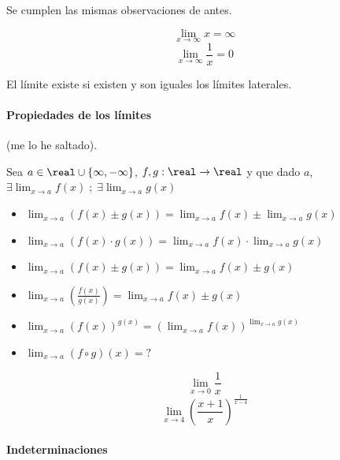 \documentclass[palatino,nosec]{Docencia}
\begin{document}
\obs Se cumplen las mismas observaciones de antes.

\begin{example}
	\[\lim_{x\to\infty}x=\infty\]
	\[\lim_{x\to\infty}\frac{1}{x}=0\]
\end{example}

\begin{defn} 
	El límite existe si existen y son iguales los límites laterales. 
\end{defn}


\paragraph{Propiedades de los límites} (me lo he saltado).

Sea $a\in\real\cup\{\infty,-\infty\}$, $f,g:\real\to\real$ y que dado $a$, $\exists\lim_{x\to a}f(x) \;;\; \exists\lim_{x\to a}g(x)$
\begin{itemize}
	\item $\lim_{x\to a} \left(f(x) \pm g(x)\right) = \lim_{x\to a} f(x) \pm \lim_{x\to a} g(x)$
	\item $\lim_{x\to a} \left(f(x) · g(x)\right) = \lim_{x\to a} f(x) · \lim_{x\to a} g(x)$
	\item $\lim_{x\to a} \left(f(x) \pm g(x)\right) = \lim_{x\to a} f(x) \pm g(x)$
	\item $\lim_{x\to a} \left(\frac{f(x)}{g(x)}\right) = \lim_{x\to a} f(x) \pm g(x)$
	\item $\lim_{x\to a} \left(f(x)\right)^{g(x)} = \left(\lim_{x\to a} f(x)\right)^{\lim_{x\to a} g(x)}$	
	\item $\lim_{x\to a} (f\circ g)(x) = ?$	
\end{itemize}

\begin{example}
\[\lim_{x\to 0}\frac{1}{x}\]
 \[\lim_{x\to 4}\left(\frac{x+1}{x}\right)^{\frac{1}{x-4}}\]
\end{example}

\paragraph{Indeterminaciones}
\end{document}
